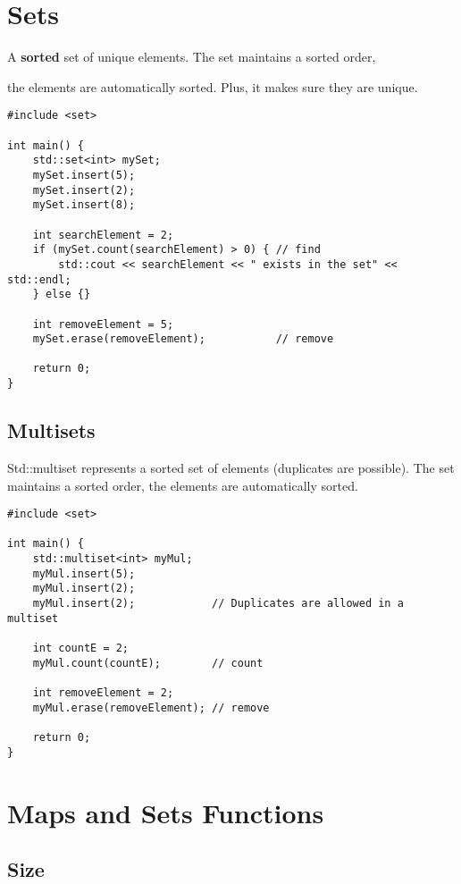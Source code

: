 \documentclass[openany]{report}
\begin{document}
\section{Sets}

A \textbf{sorted} set of unique elements. The set maintains a sorted order,

the elements are automatically sorted. Plus, it makes sure they are unique.

\begin{verbatim}
#include <set>

int main() {
    std::set<int> mySet;
    mySet.insert(5);
    mySet.insert(2);
    mySet.insert(8);

    int searchElement = 2;
    if (mySet.count(searchElement) > 0) { // find
        std::cout << searchElement << " exists in the set" << std::endl;
    } else {}

    int removeElement = 5;
    mySet.erase(removeElement);           // remove

    return 0;
}
\end{verbatim}

\subsection{Multisets}

Std::multiset represents a sorted set of elements (duplicates are possible). The set maintains a sorted order,
the elements are automatically sorted.

\begin{verbatim}
#include <set>

int main() {
    std::multiset<int> myMul;
    myMul.insert(5);
    myMul.insert(2);
    myMul.insert(2);            // Duplicates are allowed in a multiset

    int countE = 2;
    myMul.count(countE);        // count

    int removeElement = 2;
    myMul.erase(removeElement); // remove

    return 0;
}
\end{verbatim}

\section{Maps and Sets Functions}

\subsection{Size}
\end{document}
